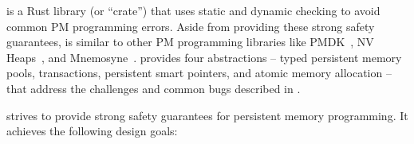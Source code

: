 \This{} is a Rust library (or ``crate'') that uses static and dynamic checking to avoid common PM programming errors.
Aside from providing these strong safety guarantees, \this{} 
is similar to other PM programming libraries like
PMDK~\cite{pmdk}, NV Heaps~\cite{nvheaps}, and Mnemosyne~\cite{mnemosyne}.
\This{} provides four abstractions -- typed persistent memory pools,
transactions, persistent smart pointers, and atomic memory allocation -- that
address the challenges and common bugs described in .

\This{} strives to provide strong safety guarantees for persistent memory programming.
It achieves the following design goals:







  


